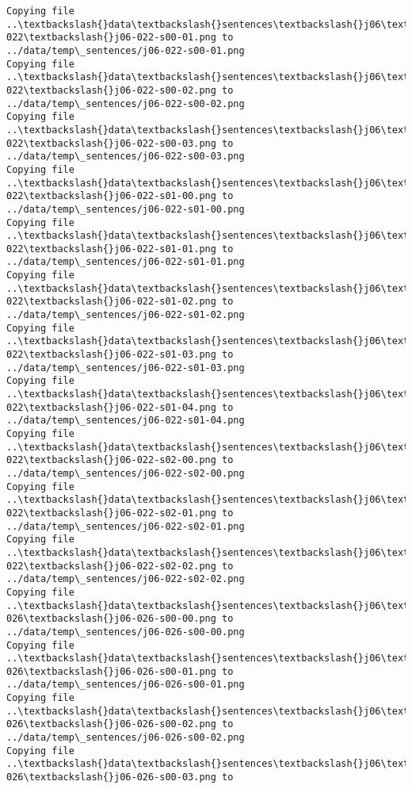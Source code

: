 \documentclass[11pt]{article}
\begin{document}
\begin{Verbatim}[commandchars=\\\{\}]
Copying file ..\textbackslash{}data\textbackslash{}sentences\textbackslash{}j06\textbackslash{}j06-022\textbackslash{}j06-022-s00-01.png to
../data/temp\_sentences/j06-022-s00-01.png
Copying file ..\textbackslash{}data\textbackslash{}sentences\textbackslash{}j06\textbackslash{}j06-022\textbackslash{}j06-022-s00-02.png to
../data/temp\_sentences/j06-022-s00-02.png
Copying file ..\textbackslash{}data\textbackslash{}sentences\textbackslash{}j06\textbackslash{}j06-022\textbackslash{}j06-022-s00-03.png to
../data/temp\_sentences/j06-022-s00-03.png
Copying file ..\textbackslash{}data\textbackslash{}sentences\textbackslash{}j06\textbackslash{}j06-022\textbackslash{}j06-022-s01-00.png to
../data/temp\_sentences/j06-022-s01-00.png
Copying file ..\textbackslash{}data\textbackslash{}sentences\textbackslash{}j06\textbackslash{}j06-022\textbackslash{}j06-022-s01-01.png to
../data/temp\_sentences/j06-022-s01-01.png
Copying file ..\textbackslash{}data\textbackslash{}sentences\textbackslash{}j06\textbackslash{}j06-022\textbackslash{}j06-022-s01-02.png to
../data/temp\_sentences/j06-022-s01-02.png
Copying file ..\textbackslash{}data\textbackslash{}sentences\textbackslash{}j06\textbackslash{}j06-022\textbackslash{}j06-022-s01-03.png to
../data/temp\_sentences/j06-022-s01-03.png
Copying file ..\textbackslash{}data\textbackslash{}sentences\textbackslash{}j06\textbackslash{}j06-022\textbackslash{}j06-022-s01-04.png to
../data/temp\_sentences/j06-022-s01-04.png
Copying file ..\textbackslash{}data\textbackslash{}sentences\textbackslash{}j06\textbackslash{}j06-022\textbackslash{}j06-022-s02-00.png to
../data/temp\_sentences/j06-022-s02-00.png
Copying file ..\textbackslash{}data\textbackslash{}sentences\textbackslash{}j06\textbackslash{}j06-022\textbackslash{}j06-022-s02-01.png to
../data/temp\_sentences/j06-022-s02-01.png
Copying file ..\textbackslash{}data\textbackslash{}sentences\textbackslash{}j06\textbackslash{}j06-022\textbackslash{}j06-022-s02-02.png to
../data/temp\_sentences/j06-022-s02-02.png
Copying file ..\textbackslash{}data\textbackslash{}sentences\textbackslash{}j06\textbackslash{}j06-026\textbackslash{}j06-026-s00-00.png to
../data/temp\_sentences/j06-026-s00-00.png
Copying file ..\textbackslash{}data\textbackslash{}sentences\textbackslash{}j06\textbackslash{}j06-026\textbackslash{}j06-026-s00-01.png to
../data/temp\_sentences/j06-026-s00-01.png
Copying file ..\textbackslash{}data\textbackslash{}sentences\textbackslash{}j06\textbackslash{}j06-026\textbackslash{}j06-026-s00-02.png to
../data/temp\_sentences/j06-026-s00-02.png
Copying file ..\textbackslash{}data\textbackslash{}sentences\textbackslash{}j06\textbackslash{}j06-026\textbackslash{}j06-026-s00-03.png to

\end{Verbatim}
\end{document}
